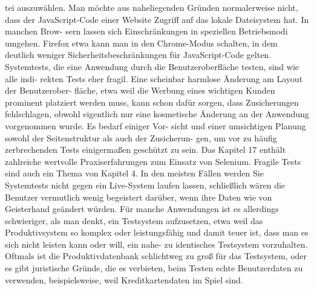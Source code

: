 tei auszuwählen. Man möchte aus naheliegenden Gründen normalerweise nicht, dass der
JavaScript-Code einer Website Zugriff auf das lokale Dateisystem hat. In manchen Brow-
sern lassen sich Einschränkungen in speziellen Betriebsmodi umgehen. Firefox etwa kann
man in den Chrome-Modus schalten, in dem deutlich weniger Sicherheitsbeschränkungen
für JavaScript-Code gelten.
Systemtests, die eine Anwendung durch die Benutzeroberfläche testen, sind wie alle indi-
rekten Tests eher fragil. Eine scheinbar harmlose Änderung am Layout der Benutzerober-
fläche, etwa weil die Werbung eines wichtigen Kunden prominent platziert werden muss,
kann schon dafür sorgen, dass Zusicherungen fehlschlagen, obwohl eigentlich nur eine
kosmetische Änderung an der Anwendung vorgenommen wurde. Es bedarf einiger Vor-
sicht und einer umsichtigen Planung sowohl der Seitenstruktur als auch der Zusicherun-
gen, um vor zu häufig zerbrechenden Tests einigermaßen geschützt zu sein. Das Kapitel 17
enthält zahlreiche wertvolle Praxiserfahrungen zum Einsatz von Selenium. Fragile Tests
sind auch ein Thema von Kapitel 4.
In den meisten Fällen werden Sie Systemtests nicht gegen ein Live-System laufen lassen,
schließlich wären die Benutzer vermutlich wenig begeistert darüber, wenn ihre Daten wie
von Geisterhand geändert würden. Für manche Anwendungen ist es allerdings schwieriger,
als man denkt, ein Testsystem aufzusetzen, etwa weil das Produktivsystem so komplex oder
leistungsfähig und damit teuer ist, dass man es sich nicht leisten kann oder will, ein nahe-
zu identisches Testsystem vorzuhalten. Oftmals ist die Produktivdatenbank schlichtweg zu
groß für das Testsystem, oder es gibt juristische Gründe, die es verbieten, beim Testen echte
Benutzerdaten zu verwenden, beispielsweise, weil Kreditkartendaten im Spiel sind.

